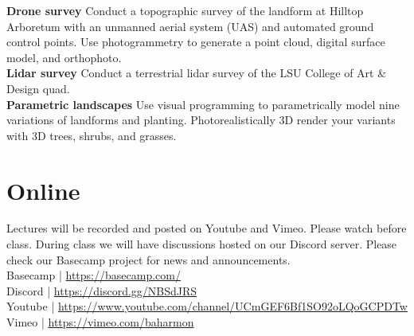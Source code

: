 \documentclass[11pt,article,oneside]{memoir}
\begin{document}
\nocite{*} \printbibliography[keyword=intro, heading=none]

\noindent \textbf{Drone survey}
Conduct a topographic survey 
of the landform at Hilltop Arboretum
with an unmanned aerial system (UAS)
and automated ground control points. 
Use photogrammetry to generate a point cloud, 
digital surface model, and orthophoto.
\\

\noindent \textbf{Lidar survey}
Conduct a terrestrial lidar survey of the 
LSU College of Art \& Design quad. 
\\


\noindent \textbf{Parametric landscapes}
Use visual programming to parametrically model
nine variations of landforms and planting. 
Photorealistically 3D render your variants
with 3D trees, shrubs, and grasses. 


\nocite{*} \printbibliography[keyword=grasshopper, heading=none]

\section{Online}

Lectures will be recorded and posted 
on Youtube and Vimeo. 
Please watch before class.
During class we will have discussions 
hosted on our Discord server. 
Please check our Basecamp project
for news and announcements.\\

\noindent
Basecamp | \url{https://basecamp.com/}\\
Discord | \url{https://discord.gg/NBSdJRS}\\
Youtube | \url{https://www.youtube.com/channel/UCmGEF6Bf1SO92oLQoGCPDTw}\\
Vimeo | \url{https://vimeo.com/baharmon}\\

\end{document}
